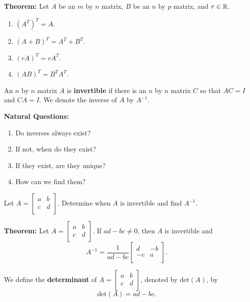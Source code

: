 \documentclass[12pt,letterpaper]{article}
\begin{document}
\begin{enumerate}
{\bf Theorem:} Let $A$ be an $m$ by $n$ matrix, $B$ be an $n$ by $p$ matrix, and $r\in \mathbb{R}$.
\begin{enumerate}
\item $(A^{T})^{T}=A.$
\item $(A+B)^{T}=A^{T}+B^{T}.$
\item $(rA)^{T}=r A^{T}$.
\item $(AB)^{T}=B^{T} A^{T}$.
\end{enumerate}

\begin{defn}
An $n$ by $n$ matrix $A$ is {\bf invertible} if there is an $n$ by $n$ matrix $C$ so that $AC=I$ and $CA=I$. We denote the inverse of $A$ by $A^{-1}$.
\end{defn}

{\bf Natural Questions:}
\begin{enumerate}
\item Do inverses always exist?
\item If not, when do they exist?
\item If they exist, are they unique?
\item How can we find them?
\end{enumerate}

\Problem Let $A=\begin{bmatrix} a & b\\ c & d\\ \end{bmatrix}$. Determine when $A$ is invertible and find $A^{-1}$. 

\newpage

{\bf Theorem:} Let $A=\begin{bmatrix} a & b \\ c & d\\ \end{bmatrix}$. If $ad-bc\neq 0$, then $A$ is invertible  and $$A^{-1}= \frac{1}{ad-bc} \begin{bmatrix} d & -b\\ -c &a \\ \end{bmatrix}.$$

\begin{defn}
We define the {\bf determinant} of $A=\begin{bmatrix} a & b \\ c & d\\ \end{bmatrix}$, denoted by $\text{det}(A)$, by $$\text{det}(A)=ad-bc.$$
\end{defn}


\end{enumerate}
\end{document}
